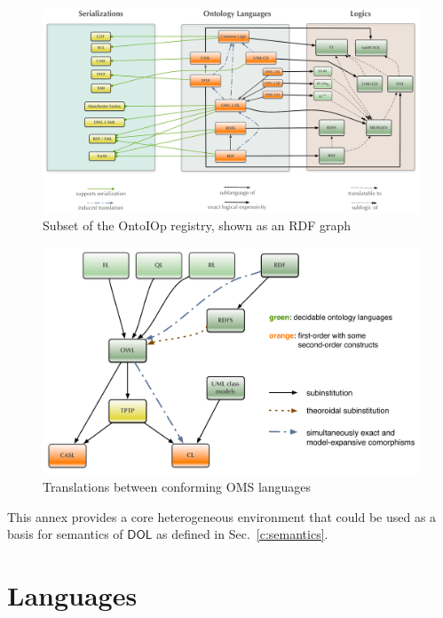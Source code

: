 \documentclass[10pt,fleqn,final]{scrreprt}
\newcommand*{\DOL}{\ensuremath{\mathsf{DOL}}\xspace}
\newcommand{\sclause}[1]{\section{#1}}
\begin{document}

\begin{figure}
\centering
   \includegraphics[width=\textwidth]{illustrations/DOL-ontograph-layers-OMG} 
  \caption{Subset of the OntoIOp registry, shown as an RDF graph}
\label{f:DOL-threelayers}
\end{figure}


\begin{figure}
  \centering
  \includegraphics[width=\textwidth]{illustrations/ontograph-standards-new}
  \caption{Translations between conforming OMS languages}
  \label{fig:ontograph-standards}
\end{figure}

This annex provides a core heterogeneous environment that could be used as a basis for 
semantics of \DOL as defined in Sec.~\ref{c:semantics}.

\sclause{Languages}
\end{document}
